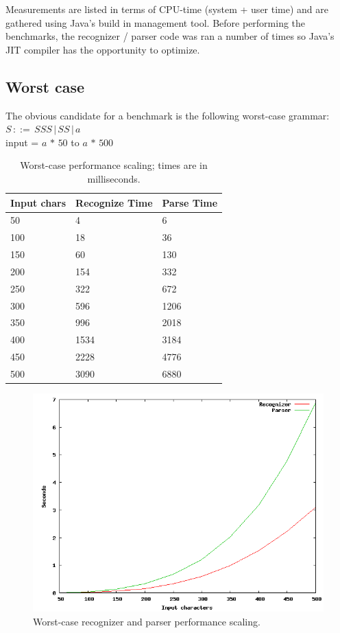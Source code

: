 \documentclass[a4paper,10pt]{article}
\begin{document}
Measurements are listed in terms of CPU-time (system + user time) and are gathered using Java's build in management tool. Before performing the benchmarks, the recognizer / parser code was ran a number of times so Java's JIT compiler has the opportunity to optimize.

\subsection{Worst case}

The obvious candidate for a benchmark is the following worst-case grammar:
$S\,::=\,SSS\,|\,SS\,|\,a$\\
input = $a\,*\,50$ to $a\,*\,500$

\begin{table}[H]
\centering
\begin{tabular}{ | p{5em} | p{7em} | p{6em} | }
  \hline
  Input chars & Recognize Time & Parse Time \\
  \hline
  50 & 4 & 6 \\
  100 & 18 & 36 \\
  150 & 60 & 130 \\
  200 & 154 & 332 \\
  250 & 322 & 672 \\
  300 & 596 & 1206 \\
  350 & 996 & 2018 \\
  400 & 1534 & 3184 \\
  450 & 2228 & 4776 \\
  500 & 3090 & 6880 \\
  \hline
\end{tabular}
\caption{Worst-case performance scaling; times are in milliseconds.}
\end{table}

\begin{figure}[H]
\centering
\includegraphics[scale=0.5]{worst-case.png}
\caption{Worst-case recognizer and parser performance scaling.}
\end{figure}
\end{document}
